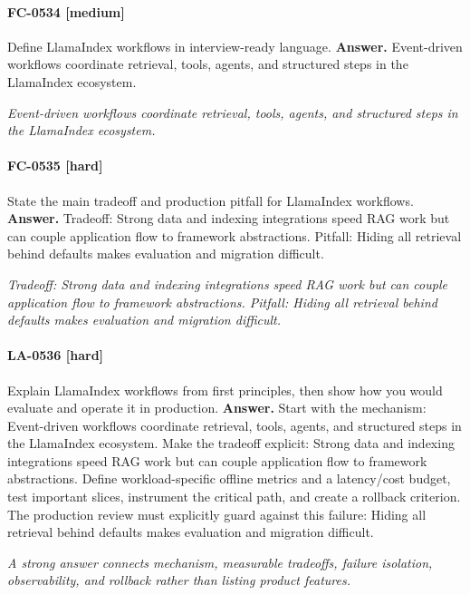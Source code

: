 \paragraph{FC-0534 [medium]} Define LlamaIndex workflows in interview-ready language.
\noindent\textbf{Answer.} Event-driven workflows coordinate retrieval, tools, agents, and structured steps in the LlamaIndex ecosystem.
\par\textit{Event-driven workflows coordinate retrieval, tools, agents, and structured steps in the LlamaIndex ecosystem.}
\paragraph{FC-0535 [hard]} State the main tradeoff and production pitfall for LlamaIndex workflows.
\noindent\textbf{Answer.} Tradeoff: Strong data and indexing integrations speed RAG work but can couple application flow to framework abstractions. Pitfall: Hiding all retrieval behind defaults makes evaluation and migration difficult.
\par\textit{Tradeoff: Strong data and indexing integrations speed RAG work but can couple application flow to framework abstractions. Pitfall: Hiding all retrieval behind defaults makes evaluation and migration difficult.}
\paragraph{LA-0536 [hard]} Explain LlamaIndex workflows from first principles, then show how you would evaluate and operate it in production.
\noindent\textbf{Answer.} Start with the mechanism: Event-driven workflows coordinate retrieval, tools, agents, and structured steps in the LlamaIndex ecosystem. Make the tradeoff explicit: Strong data and indexing integrations speed RAG work but can couple application flow to framework abstractions. Define workload-specific offline metrics and a latency/cost budget, test important slices, instrument the critical path, and create a rollback criterion. The production review must explicitly guard against this failure: Hiding all retrieval behind defaults makes evaluation and migration difficult.
\par\textit{A strong answer connects mechanism, measurable tradeoffs, failure isolation, observability, and rollback rather than listing product features.}
